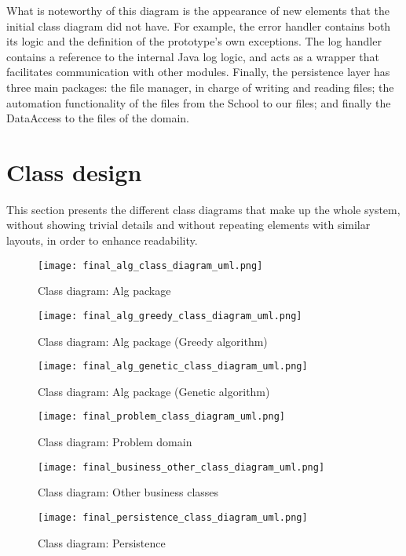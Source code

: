 What is noteworthy of this diagram is the appearance of new elements that the initial class diagram did not have. For example, the error handler contains both its logic and the definition of the prototype's own exceptions. The log handler contains a reference to the internal Java log logic, and acts as a wrapper that facilitates communication with other modules. Finally, the persistence layer has three main packages: the file manager, in charge of writing and reading files; the automation functionality of the files from the School to our files; and finally the DataAccess to the files of the domain.




\section{Class design}

This section presents the different class diagrams that make up the whole system, without showing trivial details and without repeating elements with similar layouts, in order to enhance readability.


\begin{figure}[H]
    \caption{Class diagram: Alg package}
  \centering
  \texttt{[image: final\_alg\_class\_diagram\_uml.png]}
\end{figure}

\begin{figure}[H]
    \caption{Class diagram: Alg package (Greedy algorithm)}
  \centering
  \texttt{[image: final\_alg\_greedy\_class\_diagram\_uml.png]}
\end{figure}

\begin{figure}[H]
    \caption{Class diagram: Alg package (Genetic algorithm)}
  \centering
  \texttt{[image: final\_alg\_genetic\_class\_diagram\_uml.png]}
\end{figure}

\begin{figure}[H]
    \caption{Class diagram: Problem domain}
  \centering
  \texttt{[image: final\_problem\_class\_diagram\_uml.png]}
\end{figure}

\begin{figure}[H]
    \caption{Class diagram: Other business classes}
  \centering
  \texttt{[image: final\_business\_other\_class\_diagram\_uml.png]}
\end{figure}

\begin{figure}[H]
    \caption{Class diagram: Persistence}
  \centering
  \texttt{[image: final\_persistence\_class\_diagram\_uml.png]}
\end{figure}

